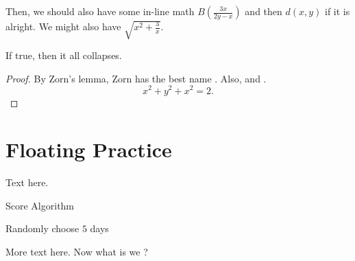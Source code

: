 Then, we should also have some in-line math $B\left(\frac{3x}{2y-x}\right)$ and then $d(x,y)$ if it is alright. We might also have $\sqrt{x^2+\frac{3}{x}}$.

\begin{theorem}
    If true, then it all collapses.
\end{theorem}
\begin{proof}
    By Zorn's lemma, Zorn has the best name \autocite{martiniCompleteReducedConvex2019}.
    Also, \autocite{chenGraphHomotopyGraham2001} and \autocite{dochtermannMinimalGraphsContractible2023}.
    \[x^2+y^2+x^2=2.\]

\end{proof}
\section{Floating Practice}
Text here.

\begin{algorithm}
    \caption{Score Algorithm}
    \begin{algorithmic}[1]
        \Statex
        \State Randomly choose $5$ days
        \EndFor
        \EndFor
    \end{algorithmic}
\end{algorithm}

More text here. Now what is we ?


\printbibliography[heading=subbibnumbered]

